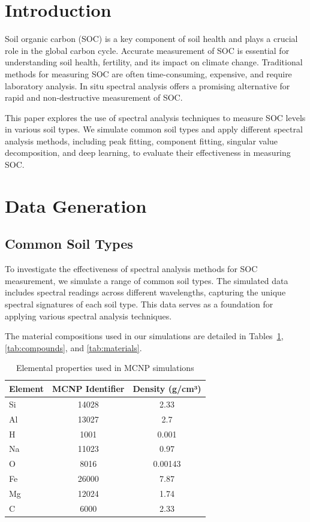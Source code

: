 \documentclass[review]{elsarticle}
\begin{document}
\linenumbers

\section{Introduction}

Soil organic carbon (SOC) is a key component of soil health and plays a crucial role in the global carbon cycle. Accurate measurement of SOC is essential for understanding soil health, fertility, and its impact on climate change. Traditional methods for measuring SOC are often time-consuming, expensive, and require laboratory analysis. In situ spectral analysis offers a promising alternative for rapid and non-destructive measurement of SOC.

This paper explores the use of spectral analysis techniques to measure SOC levels in various soil types. We simulate common soil types and apply different spectral analysis methods, including peak fitting, component fitting, singular value decomposition, and deep learning, to evaluate their effectiveness in measuring SOC.

\section{Data Generation}

\subsection{Common Soil Types}

To investigate the effectiveness of spectral analysis methods for SOC measurement, we simulate a range of common soil types. The simulated data includes spectral readings across different wavelengths, capturing the unique spectral signatures of each soil type. This data serves as a foundation for applying various spectral analysis techniques.

The material compositions used in our simulations are detailed in Tables~\ref{tab:elements}, \ref{tab:compounds}, and \ref{tab:materials}.

\begin{table}[H]
\centering
\caption{Elemental properties used in MCNP simulations}
\label{tab:elements}
\begin{tabular}{@{}lcc@{}}
\toprule
Element & MCNP Identifier & Density (g/cm³) \\
\midrule
Si & 14028 & 2.33 \\
Al & 13027 & 2.7 \\
H & 1001 & 0.001 \\
Na & 11023 & 0.97 \\
O & 8016 & 0.00143 \\
Fe & 26000 & 7.87 \\
Mg & 12024 & 1.74 \\
C & 6000 & 2.33 \\
\bottomrule
\end{tabular}
\end{table}
\end{document}
